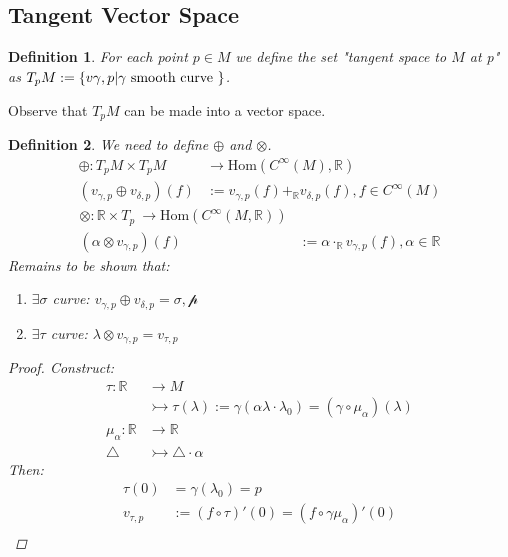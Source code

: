 \documentclass[10pt, oneside]{article}
\newcommand{\R}{\mathbb{R}}
\newtheorem{defn}{Definition}
\begin{document}
  \subsection{Tangent Vector Space}
     \begin{defn}
        For each point $p \in M$ we define the set "tangent space to $M$ at p" as $\\T_p M := \{v{\gamma,p} | \gamma \text{ smooth curve } \}$.
     \end{defn}
     Observe that $T_p M$ can be made into a vector space.
     \begin{defn}
        We need to define $\oplus$ and $\otimes$.
        \begin{align*}
           \oplus: T_p M \times T_p M &\to \text{Hom}(C^\infty(M),\R) \\
           (v_{\gamma,p} \oplus v_{\delta,p})(f) &:= v_{\gamma,p}(f) +_{\R} v_{\delta,p} (f), f \in C^\infty (M)
        \end{align*}
        \begin{align*}
           \otimes: \R \times T_p \ \to \text{Hom}(C^\infty(M,\R)) \\
           (\alpha \otimes v_{\gamma,p})(f) &:= \alpha \cdot_{\R} v_{\gamma,p} (f), \alpha \in \R
        \end{align*}
        Remains to be shown that:
        \begin{enumerate}
           \item $\exists \sigma$ curve: $v_{\gamma,p} \oplus v_{\delta,p} = \mathcal{\sigma,p}$
           \item $\exists \tau$ curve: $\lambda \otimes v_{\gamma,p} = v_{\tau,p}$
        \end{enumerate}
        \begin{proof}
           Construct:
           \begin{align*}
              \tau: \R &\to M \\
              &\rightarrowtail \tau(\lambda) := \gamma(\alpha \lambda \cdot \lambda_0) = (\gamma \circ \mu_{\alpha})(\lambda) \\
              \mu_\alpha: \R &\to \R \\
              \triangle &\rightarrowtail \triangle \cdot \alpha
           \end{align*}
           Then:
           \begin{align*}
              \tau (0) &= \gamma(\lambda_0) = p \\
              v_{\tau,p} &:= (f \circ \tau)'(0) = (f \circ \gamma \mu_\alpha)'(0) \\

\end{align*}
\end{proof}
\end{defn}
\end{document}
